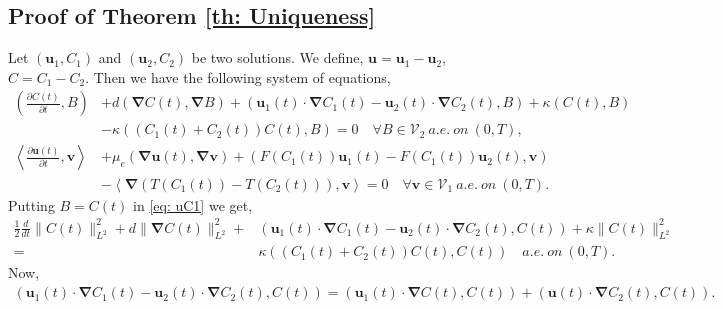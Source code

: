 \documentclass[final,3p,times]{elsarticle}
\theoremstyle{plain}
\theoremstyle{remark}
\theoremstyle{plain}
\theoremstyle{remark}
\begin{document}
\subsection{Proof of Theorem \ref{th: Uniqueness}}
Let $\left(\mathbf{u}_1,C_1\right)$ and  $\left(\mathbf{u}_2,C_2\right)$ be two solutions. We define, $\mathbf{u}=\mathbf{u}_1-\mathbf{u}_2$, $C=C_1-C_2$. Then we have the following system of equations,
\begin{align}
    \left(\frac{\partial C\left(t\right)}{\partial t},B\right)
    & + d\left(\boldsymbol{\nabla} C\left(t\right),\boldsymbol{\nabla} B\right)+\left(\mathbf{u}_1 \left(t\right)\cdot\boldsymbol{\nabla} C_1\left(t\right)-\mathbf{u}_2 \left(t\right)\cdot \boldsymbol{\nabla} C_2\left(t\right),B\right) + \kappa \left(C\left(t\right), B\right) \nonumber \\ 
    & -\kappa \left(\left(C_1\left(t\right) + C_2\left(t\right)\right)C\left(t\right), B\right) = 0 \quad  \forall B \in \mathscr V_2\ a.e.\ on\ \left(0,T\right),\label{eq: uC1} \\
   \left \langle\frac{\partial\mathbf{u}\left(t\right)}{\partial t},\mathbf{v}\right \rangle 
   & + \mu _e\left(\boldsymbol{\nabla}\mathbf{u}\left(t\right),\boldsymbol{\nabla} \mathbf v\right) + \left(F\left(C_1\left(t\right)\right) \mathbf u_1\left(t\right)-F\left(C_1\left(t\right)\right) \mathbf u_2\left(t\right),\mathbf v\right) \nonumber \\ 
   & - \left \langle\boldsymbol{\nabla}\left(T\left(C_1\left(t\right)\right)-T\left(C_2\left(t\right)\right)\right),\mathbf v\right \rangle = 0 \quad \forall \mathbf{v} \in \mathscr V_1 \ a.e.\ on\ \left(0,T\right). \label{eq: uu1}
\end{align}
Putting $B=C\left(t\right)$ in \eqref{eq: uC1} we get,
\begin{align}
    \frac{1}{2} \frac{d}{dt}\|C\left(t\right)\|^2_{L^2}+d\|\boldsymbol{\nabla} C\left(t\right)\|^2_{L^2}+&\left(\mathbf u_1\left(t\right)\cdot\boldsymbol{\nabla} C_1\left(t\right)-\mathbf u_2\left(t\right)\cdot\boldsymbol{\nabla} C_2\left(t\right),C\left(t\right)\right)+\kappa \|C\left(t\right)\|^2_{L^2}\nonumber\\  =&\kappa \left(\left(C_1\left(t\right)+C_2\left(t\right)\right)C\left(t\right),C\left(t\right)\right) \quad a.e.\ on\ \left(0,T\right). \label{eq: uC2}
\end{align}
Now,
\begin{align}
\left(\mathbf u_1\left(t\right)\cdot\boldsymbol{\nabla} C_1\left(t\right)-\mathbf u_2\left(t\right)\cdot\boldsymbol{\nabla} C_2\left(t\right),C\left(t\right)\right)=\left(\mathbf u_1\left(t\right)\cdot\boldsymbol{\nabla} C\left(t\right),C\left(t\right)\right)+\left(\mathbf u\left(t\right) \cdot \boldsymbol{\nabla} C_2\left(t\right),C\left(t\right)\right).
\end{align}
\end{document}
